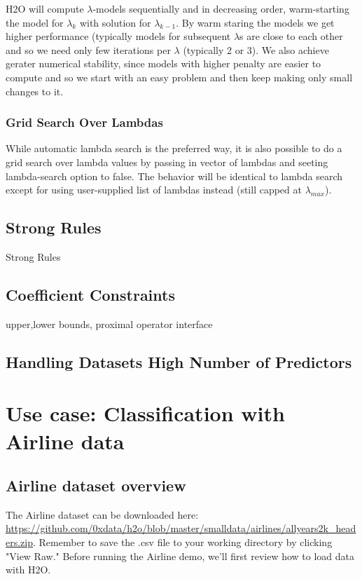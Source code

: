 \documentclass[11pt]{article}
\begin{document}
H2O will compute $\lambda$-models sequentially and in decreasing order, warm-starting the model for $\lambda_k$ with solution for $\lambda_{k-1}$. By warm staring the models we get higher performance (typically models for subsequent $\lambda$s are close to each other and so we need only few iterations per $\lambda$ (typically 2 or 3). We also achieve gerater numerical stability, since models with higher penalty are easier to compute and so we start with an easy problem and then keep making only small changes to it.
    
\subsubsection{Grid Search Over Lambdas}
While automatic lambda search is the preferred way, it is also possible to do a grid search over lambda values by passing in vector of lambdas and seeting lambda-search option to false. The behavior will be identical to lambda search except for using user-supplied list of lambdas instead (still capped at $\lambda_{max}$).

\subsection{Strong Rules} %
Strong Rules 

\subsection{Coefficient Constraints}
upper,lower bounds, proximal operator interface

\subsection{Handling Datasets High Number of Predictors}


\section{Use case: Classification with Airline data}


\subsection{Airline dataset overview} 

The Airline dataset can be downloaded here: \url{https://github.com/0xdata/h2o/blob/master/smalldata/airlines/allyears2k_headers.zip}. Remember to save the .csv file to your working directory by clicking  "View Raw."  Before running the Airline demo, we'll first review how to load data with H2O. 
\end{document}
